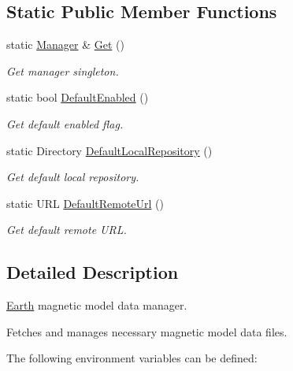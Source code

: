 \subsection*{Static Public Member Functions}
\begin{DoxyCompactItemize}
\item 
static \hyperlink{classostk_1_1physics_1_1environment_1_1magnetic_1_1earth_1_1_manager}{Manager} \& \hyperlink{classostk_1_1physics_1_1environment_1_1magnetic_1_1earth_1_1_manager_a28a3c063a2d679f800f03b6763e13c73}{Get} ()
\begin{DoxyCompactList}\small\item\em Get manager singleton. \end{DoxyCompactList}\item 
static bool \hyperlink{classostk_1_1physics_1_1environment_1_1magnetic_1_1earth_1_1_manager_a074e8c53dee909cfa7d34f9b1eb5ba1a}{Default\+Enabled} ()
\begin{DoxyCompactList}\small\item\em Get default enabled flag. \end{DoxyCompactList}\item 
static Directory \hyperlink{classostk_1_1physics_1_1environment_1_1magnetic_1_1earth_1_1_manager_a01541c8637c766a6c769f0b140293197}{Default\+Local\+Repository} ()
\begin{DoxyCompactList}\small\item\em Get default local repository. \end{DoxyCompactList}\item 
static U\+RL \hyperlink{classostk_1_1physics_1_1environment_1_1magnetic_1_1earth_1_1_manager_aedefa57c3b45cd22a7aca9e5b08fe71f}{Default\+Remote\+Url} ()
\begin{DoxyCompactList}\small\item\em Get default remote U\+RL. \end{DoxyCompactList}\end{DoxyCompactItemize}


\subsection{Detailed Description}
\hyperlink{classostk_1_1physics_1_1environment_1_1magnetic_1_1_earth}{Earth} magnetic model data manager. 

Fetches and manages necessary magnetic model data files.

The following environment variables can be defined\+:


